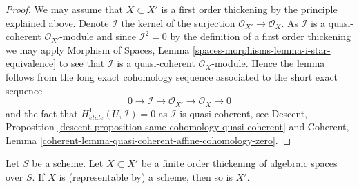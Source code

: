 \begin{proof}
We may assume that $X \subset X'$ is a first order thickening by the
principle explained above. Denote $\mathcal{I}$ the kernel of the surjection
$\mathcal{O}_{X'} \to \mathcal{O}_X$. As $\mathcal{I}$ is a quasi-coherent
$\mathcal{O}_{X'}$-module and since $\mathcal{I}^2 = 0$ by the definition
of a first order thickening we may apply
Morphism of Spaces, Lemma \ref{spaces-morphisms-lemma-i-star-equivalence}
to see that $\mathcal{I}$ is a quasi-coherent $\mathcal{O}_X$-module.
Hence the lemma follows from the long exact cohomology sequence
associated to the short exact sequence
$$
0 \to \mathcal{I} \to \mathcal{O}_{X'} \to \mathcal{O}_X \to 0
$$
and the fact that $H^1_{\acute{e}tale}(U, \mathcal{I}) = 0$ as
$\mathcal{I}$ is quasi-coherent, see
Descent, Proposition \ref{descent-proposition-same-cohomology-quasi-coherent}
and
Coherent, Lemma \ref{coherent-lemma-quasi-coherent-affine-cohomology-zero}.
\end{proof}

\begin{lemma}
\label{lemma-first-order-thickening-scheme}
Let $S$ be a scheme. Let $X \subset X'$ be a finite order thickening
of algebraic spaces over $S$. If $X$ is (representable by) a scheme,
then so is $X'$.
\end{lemma}


